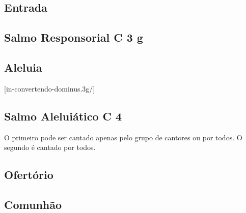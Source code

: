 
\subsection{Entrada}\label{subsection:proprium-sanctorum/sanctorum-petri-et-pauli-apostolorum/introitus}

\subsection[Salmo Responsorial]{Salmo Responsorial \textmd{C 3 g}}\label{subsection:proprium-sanctorum/sanctorum-petri-et-pauli-apostolorum/psalmus-responsorius}

\AllowPageFlush

\subsection{Aleluia}\label{subsection:proprium-sanctorum/sanctorum-petri-et-pauli-apostolorum/alleluia}
[in-convertendo-dominus.3g/]

\subsection[Salmo Aleluiático]{Salmo Aleluiático \textmd{C 4}}\label{subsection:proprium-sanctorum/sanctorum-petri-et-pauli-apostolorum/psalmus-alleluiaticus}
\begin{rubrica}
  O primeiro {\normalfont\Rbar} pode ser cantado apenas pelo grupo de cantores ou por todos. O segundo {\normalfont\Rbar} é cantado por todos.
\end{rubrica}

\AllowPageFlush

\subsection{Ofertório}\label{subsection:proprium-sanctorum/sanctorum-petri-et-pauli-apostolorum/offertorium}

\AllowPageBreak

\subsection{Comunhão}\label{subsection:proprium-sanctorum/sanctorum-petri-et-pauli-apostolorum/communio}
